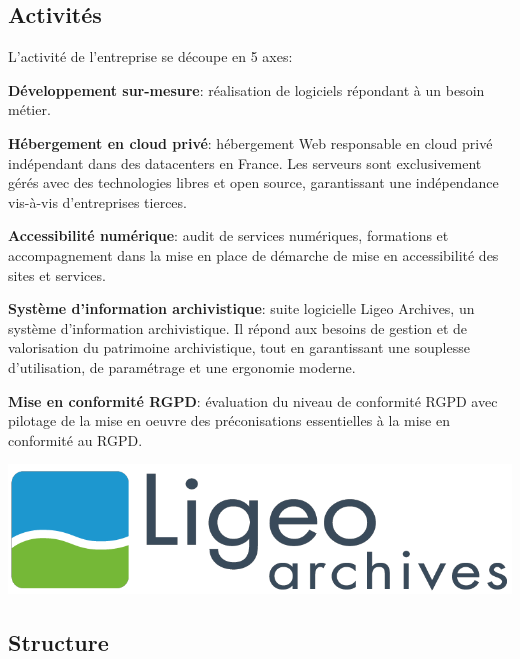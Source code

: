 \documentclass[12pt]{article}
\begin{document}
\subsection{Activités}
L'activité de l'entreprise se découpe en 5 axes:

\noindent%
\begin{minipage}{.7\textwidth}%

\textbf{Développement sur-mesure}: réalisation de logiciels répondant à un besoin métier.

\textbf{Hébergement en cloud privé}: hébergement Web responsable en \gls{cloud privé} indépendant dans des datacenters en France. 
Les serveurs sont exclusivement gérés avec des technologies libres et open source, garantissant une indépendance vis-à-vis d'entreprises tierces.

\textbf{Accessibilité numérique}: audit de services numériques, formations et accompagnement dans la mise en place de démarche de mise en accessibilité des sites et services.

\textbf{Système d'information archivistique}: suite logicielle Ligeo Archives, un système d'information archivistique. 
Il répond aux besoins de gestion et de valorisation du patrimoine archivistique, tout en garantissant une souplesse d'utilisation, de paramétrage et une ergonomie moderne.

\textbf{Mise en conformité \gls{RGPD}}: évaluation du niveau de conformité \gls{RGPD} avec pilotage de la mise en oeuvre des préconisations essentielles à la mise en conformité au \gls{RGPD}.

\end{minipage}%
\hfill
\begin{minipage}{.3\textwidth}%
\begin{center}
    \includegraphics[scale=0.22]{src/logo_ligeo.png}
\end{center}
\end{minipage}%


\subsection{Structure}
\end{document}
